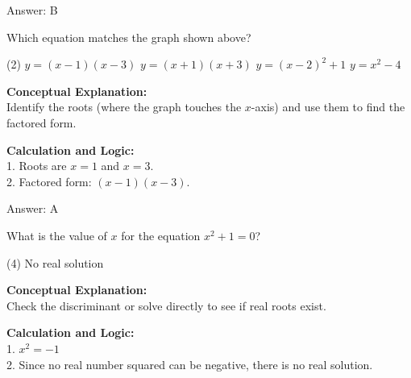 \documentclass[11pt,paper=a4,answers]{exam}
\begin{document}
\begin{questions}
\begin{solution}
\vspace{20pt}

Answer: \colorbox{yellow!100}{B}
\end{solution}

\vspace{30pt}

\question

Which equation matches the graph shown above?
\begin{tasks}(2)
    \task $y = (x - 1)(x - 3)$
    \task $y = (x + 1)(x + 3)$
    \task $y = (x - 2)^2 + 1$
    \task $y = x^2 - 4$
\end{tasks}

\begin{solution}
\textbf{Conceptual Explanation:} \\
Identify the roots (where the graph touches the $x$-axis) and use them to find the factored form.

\vspace{15pt}

\textbf{Calculation and Logic:} \\
1. Roots are $x = 1$ and $x = 3$. \\
2. Factored form: $(x - 1)(x - 3)$.

\vspace{20pt}

Answer: \colorbox{yellow!100}{A}
\end{solution}

\vspace{30pt}

\question
What is the value of $x$ for the equation $x^2 + 1 = 0$?
\begin{tasks}(4)
    \task No real solution
\end{tasks}

\begin{solution}
\textbf{Conceptual Explanation:} \\
Check the discriminant or solve directly to see if real roots exist.

\vspace{15pt}

\textbf{Calculation and Logic:} \\
1. $x^2 = -1$ \\
2. Since no real number squared can be negative, there is no real solution.


\end{solution}
\end{questions}
\end{document}
